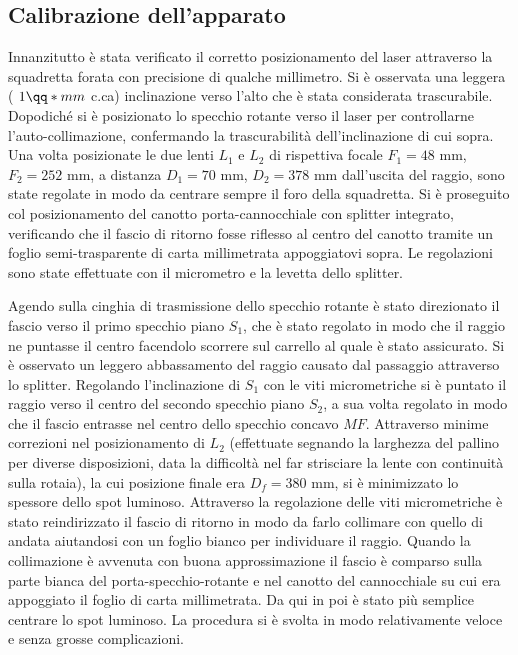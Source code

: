 \documentclass[openright]{article}
\begin{document}
    \subsection{Calibrazione dell'apparato}
    Innanzitutto è stata verificato il corretto posizionamento del laser attraverso la squadretta forata con precisione di qualche millimetro. Si è osservata una leggera ( $1 \qq*{mm}$ c.ca) inclinazione verso l'alto che è stata considerata trascurabile. Dopodiché si è posizionato lo specchio rotante verso il laser per controllarne l'auto-collimazione, confermando la trascurabilità dell'inclinazione di cui sopra. Una volta posizionate le due lenti $L_1$ e $L_2$ di rispettiva focale $F_1 = 48$ mm, $F_2= 252$ mm, a distanza $D_1= 70$ mm, $D_2=378$ mm dall'uscita del raggio, sono state regolate in modo da centrare sempre il foro della squadretta. Si è proseguito col posizionamento del canotto porta-cannocchiale con splitter integrato, verificando che il fascio di ritorno fosse riflesso al centro del canotto tramite un foglio semi-trasparente di carta millimetrata appoggiatovi sopra. Le regolazioni sono state effettuate con il micrometro e la levetta dello splitter.
    
    Agendo sulla cinghia di trasmissione dello specchio rotante è stato direzionato il fascio verso il primo specchio piano $S_1$, che è stato regolato in modo che il raggio ne puntasse il centro facendolo scorrere sul carrello al quale è stato assicurato. Si è osservato un leggero abbassamento del raggio causato dal passaggio attraverso lo splitter. Regolando l'inclinazione di $S_1$ con le viti micrometriche si è puntato il raggio verso il centro del secondo specchio piano $S_2$, a sua volta regolato in modo che il fascio entrasse nel centro dello specchio concavo $MF$. Attraverso minime correzioni nel posizionamento di $L_2$ (effettuate segnando la larghezza del pallino per diverse disposizioni, data la difficoltà nel far strisciare la lente con continuità sulla rotaia), la cui posizione finale era $D_f=380$ mm, si è minimizzato lo spessore dello spot luminoso. Attraverso la regolazione delle viti micrometriche è stato reindirizzato il fascio di ritorno in modo da farlo collimare con quello di andata aiutandosi con un foglio bianco per individuare il raggio. Quando la collimazione è avvenuta con buona approssimazione il fascio è comparso sulla parte bianca del porta-specchio-rotante e nel canotto del cannocchiale su cui era appoggiato il foglio di carta millimetrata. Da qui in poi è stato più semplice centrare lo spot luminoso. La procedura si è svolta in modo relativamente veloce e senza grosse complicazioni.
    
\end{document}
